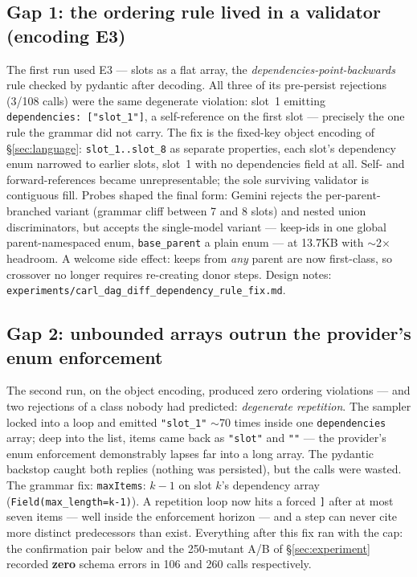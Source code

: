 \documentclass[11pt]{article}
\begin{document}
\subsection{Gap 1: the ordering rule lived in a validator (encoding E3)}
The first run used E3 --- slots as a flat array, the \emph{dependencies-point-backwards}
rule checked by pydantic after decoding. All three of its pre-persist rejections (3/108
calls) were the same degenerate violation: slot~1 emitting
\texttt{dependencies:\ ["slot\_1"]}, a self-reference on the first slot --- precisely the
one rule the grammar did not carry. The fix is the fixed-key object encoding of
\S\ref{sec:language}: \texttt{slot\_1..slot\_8} as separate properties, each slot's
dependency enum narrowed to earlier slots, slot~1 with no dependencies field at all.
Self- and forward-references became unrepresentable; the sole surviving validator is
contiguous fill. Probes shaped the final form: Gemini rejects the per-parent-branched
variant (grammar cliff between 7 and 8 slots) and nested union discriminators, but accepts
the single-model variant --- keep-ids in one global parent-namespaced enum,
\texttt{base\_parent} a plain enum --- at 13.7KB with $\sim$2$\times$ headroom. A welcome
side effect: keeps from \emph{any} parent are now first-class, so crossover no longer
requires re-creating donor steps. Design notes:
\texttt{experiments/carl\_dag\_diff\_dependency\_rule\_fix.md}.

\subsection{Gap 2: unbounded arrays outrun the provider's enum enforcement}
The second run, on the object encoding, produced zero ordering violations --- and two
rejections of a class nobody had predicted: \emph{degenerate repetition}. The sampler
locked into a loop and emitted \texttt{"slot\_1"} $\sim$70 times inside one
\texttt{dependencies} array; deep into the list, items came back as \texttt{"slot"} and
\texttt{""} --- the provider's enum enforcement demonstrably lapses far into a long array.
The pydantic backstop caught both replies (nothing was persisted), but the calls were
wasted. The grammar fix: \texttt{maxItems}: $k-1$ on slot $k$'s dependency array
(\texttt{Field(max\_length=k-1)}). A repetition loop now hits a forced \texttt{]} after at
most seven items --- well inside the enforcement horizon --- and a step can never cite more
distinct predecessors than exist. Everything after this fix ran with the cap: the
confirmation pair below and the 250-mutant A/B of \S\ref{sec:experiment} recorded
\textbf{zero} schema errors in 106 and 260 calls respectively.
\end{document}
